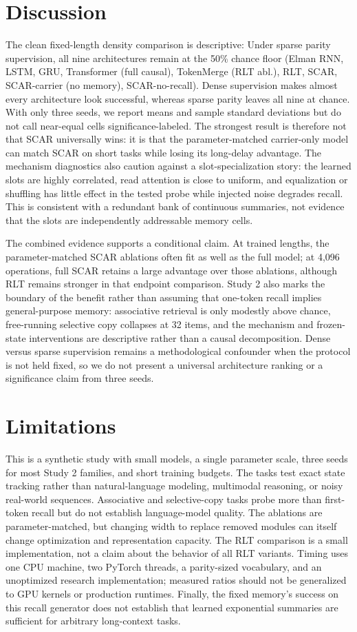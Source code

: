 \documentclass{article}
\begin{document}
\section{Discussion}
The clean fixed-length density comparison is descriptive: Under sparse parity supervision, all nine architectures remain at the 50\% chance floor (Elman RNN, LSTM, GRU, Transformer (full causal), TokenMerge (RLT abl.), RLT, SCAR, SCAR-carrier (no memory), SCAR-no-recall). Dense supervision makes almost every architecture look successful, whereas sparse parity leaves all nine at chance. With only three seeds, we report means and sample standard deviations but do not call near-equal cells significance-labeled. The strongest result is therefore not that SCAR universally wins: it is that the parameter-matched carrier-only model can match SCAR on short tasks while losing its long-delay advantage. The mechanism diagnostics also caution against a slot-specialization story: the learned slots are highly correlated, read attention is close to uniform, and equalization or shuffling has little effect in the tested probe while injected noise degrades recall. This is consistent with a redundant bank of continuous summaries, not evidence that the slots are independently addressable memory cells.

The combined evidence supports a conditional claim. At trained lengths, the
parameter-matched SCAR ablations often fit as well as the full model; at 4,096
operations, full SCAR retains a large advantage over those ablations, although
RLT remains stronger in that endpoint comparison. Study 2 also marks the
boundary of the benefit rather than assuming that one-token recall implies
general-purpose memory: associative retrieval is only modestly above chance,
free-running selective copy collapses at 32 items, and the mechanism and
frozen-state interventions are descriptive rather than a causal decomposition.
Dense versus sparse supervision remains a methodological confounder when the
protocol is not held fixed, so we do not present a universal architecture
ranking or a significance claim from three seeds.

\section{Limitations}
This is a synthetic study with small models, a single parameter scale, three
seeds for most Study 2 families, and short training budgets. The tasks test
exact state tracking rather than natural-language modeling, multimodal
reasoning, or noisy real-world sequences. Associative and selective-copy
tasks probe more than first-token recall but do not establish language-model
quality. The ablations are parameter-matched, but changing width to replace
removed modules can itself change optimization and representation capacity.
The RLT comparison is a small implementation, not a claim about the behavior
of all RLT variants. Timing uses one CPU machine, two PyTorch threads, a
parity-sized vocabulary, and an unoptimized research implementation; measured
ratios should not be generalized to GPU kernels or production runtimes.
Finally, the fixed memory's success on this recall generator does not establish
that learned exponential summaries are sufficient for arbitrary long-context
tasks.
\end{document}
